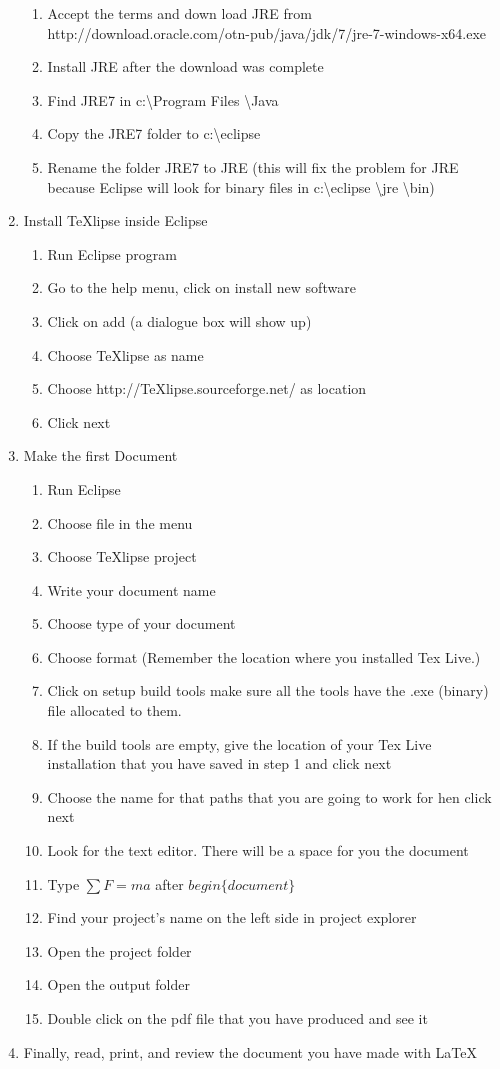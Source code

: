 \documentclass{memoir}
\begin{document}
\begin{enumerate}
\begin{enumerate}
  \item Accept the terms and down load JRE from http://download.oracle.com/otn-pub/java/jdk/7/jre-7-windows-x64.exe
  \item Install JRE after the download was complete
  \item Find JRE7 in c:\textbackslash  Program Files \textbackslash  Java
  \item Copy the JRE7 folder to c:\textbackslash  eclipse
  \item Rename the folder JRE7 to JRE (this will fix the problem for JRE because Eclipse will look for binary files in c:\textbackslash  eclipse \textbackslash jre \textbackslash bin)
\end{enumerate}
  \item Install TeXlipse inside Eclipse
  \begin{enumerate}
    \item Run Eclipse program 
    \item Go to the help menu, click on install new software
    \item Click on add (a dialogue box will show up)
    \item Choose TeXlipse as name
    \item Choose http://TeXlipse.sourceforge.net/ as location
    \item Click next
  \end{enumerate}
  \item Make the first Document
  \begin{enumerate}
    \item Run Eclipse
    \item Choose file in the menu 
    \item Choose TeXlipse project
    \item Write your document name
    \item Choose type of your document
    \item Choose format (Remember the location where you installed Tex Live.) 
    \item Click on setup build tools make sure all the tools have the .exe (binary) file allocated to them.
    \item If the build tools are empty, give the location of your Tex Live installation that you have saved in step 1 and click next
    \item Choose the name for that paths that you are going to work for hen click next
	\item Look for the text editor. There will be a space for you the document
    \item Type $\sum F = ma$ after $begin\{document\}$  
    \item Find your project's name on the left side in project explorer
    \item Open the project folder
    \item Open the output folder
    \item Double click on the pdf file that you have produced and see it    
  \end{enumerate}
  
  \item Finally, read, print, and review the document you have made with \LaTeX
\end{enumerate}
\end{document}
